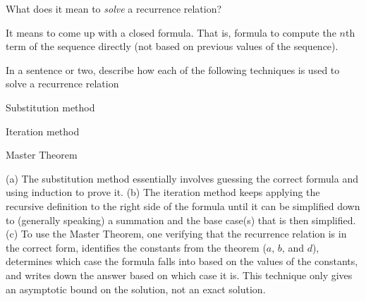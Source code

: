 \begin{requ}
What does it mean to {\em solve} a recurrence relation?
\begin{requanswer}
It means to come up with a closed formula. That is, formula to compute the $n$th term of the
sequence directly (not based on previous values of the sequence).
\end{requanswer}
\end{requ}

\begin{requ}
In a sentence or two, describe how each of the following techniques is used to solve a recurrence relation
\begin{lenum}
\item Substitution method
\item Iteration method
\item Master Theorem
\end{lenum}
\begin{requanswer}
(a) The substitution method essentially involves guessing the correct formula and using induction to prove it.
(b) The iteration method keeps applying the recursive definition to the right side of the formula until it can
be simplified down to (generally speaking) a summation and the base case(s) that is then simplified. 
(c) To use the Master Theorem, one verifying that the recurrence relation is in the correct form, 
identifies the constants from the theorem ($a$, $b$, and $d$), 
determines which case the formula falls into based on the values of the constants, 
and writes down the answer based on which case it is.
This technique only gives an asymptotic bound on the solution, not an exact solution.
\end{requanswer}
\end{requ}

